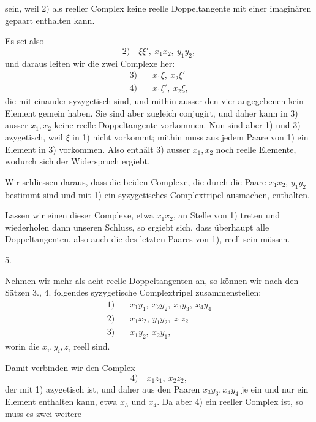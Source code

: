 sein, weil 2) als reeller Complex keine reelle Doppeltangente
mit einer imaginären gepaart enthalten kann.

Es sei also
\[
2)\quad \xi\xi',\ x_1x_2,\ y_1y_2,
\]
und daraus leiten wir die zwei Complexe her:
\[
\begin{aligned}
3)&\quad x_1\xi,\ x_2\xi'\\
4)&\quad x_1\xi',\ x_2\xi,
\end{aligned}
\]
die mit einander syzygetisch sind, und mithin ausser den vier
angegebenen kein Element gemein haben. Sie sind aber zugleich
conjugirt, und daher kann in 3) ausser $x_1, x_2$ keine reelle Doppeltangente
 vorkommen. Nun sind aber 1) und 3) azygetisch, weil
$\xi$ in 1) nicht vorkommt; mithin muss aus jedem Paare von 1)
ein Element in 3) vorkommen. Also enthält 3) ausser $x_1, x_2$ noch
reelle Elemente, wodurch sich der Widerspruch ergiebt.

Wir schliessen daraus, dass die beiden Complexe, die durch
die Paare $x_1x_2$, $y_1y_2$ bestimmt sind und mit 1) ein syzygetisches
Complextripel ausmachen,  enthalten.

Lassen wir einen dieser Complexe, etwa $x_1x_2$, an Stelle
von 1) treten und wiederholen dann unseren Schluss, so ergiebt
sich, dass überhaupt alle Doppeltangenten, also auch die des
letzten Paares von 1), reell sein müssen.

5. 

Nehmen wir mehr als acht reelle Doppeltangenten an, so
können wir nach den Sätzen 3., 4. folgendes syzygetische Complextripel
 zusammenstellen:
\[
\begin{aligned}
1)&\quad x_1y_1,\ x_2y_2,\ x_3y_3,\ x_4y_4\\
2)&\quad x_1x_2,\ y_1y_2,\ z_1z_2\\
3)&\quad x_1y_2,\ x_2y_1,
\end{aligned}
\]
worin die $x_i, y_i, z_i$ reell sind.

Damit verbinden wir den Complex
\[
4)\quad x_1z_1,\ x_2z_2,
\]
der mit 1) azygetisch ist, und daher aus den Paaren $x_3y_3, x_4y_4$
je ein und nur ein Element enthalten kann, etwa $x_3$ und $x_4$.
Da aber 4) ein reeller Complex ist, so muss es zwei weitere
